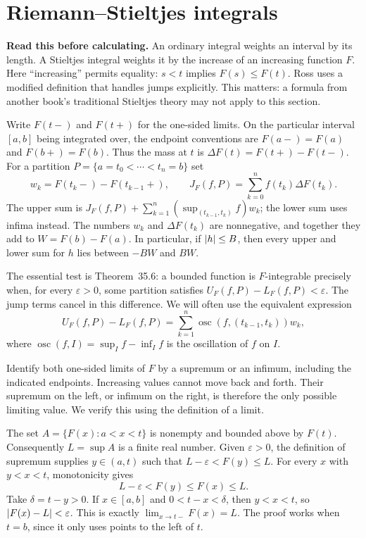 \section{Riemann--Stieltjes integrals}
\label{sec:rs-integrals}

\textbf{Read this before calculating.}
An ordinary integral weights an interval by its length. A Stieltjes
integral weights it by the increase of an increasing function $F$.
Here ``increasing'' permits equality: $s<t$ implies $F(s)\le F(t)$.
Ross uses a modified definition that handles jumps explicitly.
This matters: a formula from another book's traditional Stieltjes
theory may not apply to this section.

Write $F(t-)$ and $F(t+)$ for the one-sided limits. On the particular
interval $[a,b]$ being integrated over, the endpoint conventions are
$F(a-)=F(a)$ and $F(b+)=F(b)$. Thus the mass at $t$ is
$\Delta F(t)=F(t+)-F(t-)$. For a partition
$P=\{a=t_0<\cdots<t_n=b\}$ set
\[
 w_k=F(t_k-)-F(t_{k-1}+),\qquad
 J_F(f,P)=\sum_{k=0}^n f(t_k)\Delta F(t_k).
\]
The upper sum is $J_F(f,P)+\sum_{k=1}^n (\sup_{(t_{k-1},t_k)}f)w_k$;
the lower sum uses infima instead. The numbers $w_k$ and
$\Delta F(t_k)$ are nonnegative, and together they add to
$W=F(b)-F(a)$. In particular, if $\left|h\right|\le B$, then every upper
and lower sum for $h$ lies between $-BW$ and $BW$.

The essential test is Theorem~35.6: a bounded function is
$F$-integrable precisely when, for every $\varepsilon>0$, some
partition satisfies $U_F(f,P)-L_F(f,P)<\varepsilon$. The jump terms
cancel in this difference. We will often use the equivalent expression
\[
 U_F(f,P)-L_F(f,P)
 =\sum_{k=1}^n\operatorname{osc}(f,(t_{k-1},t_k))w_k,
\]
where $\operatorname{osc}(f,I)=\sup_I f-\inf_I f$ is the oscillation
of $f$ on $I$.

\goal Identify both one-sided limits of $F$ by a supremum or an
infimum, including the indicated endpoints.
\idea Increasing values cannot move back and forth. Their supremum
on the left, or infimum on the right, is therefore the only possible
limiting value. We verify this using the definition of a limit.

\step{(a) Approach $t\in(a,b]$ from the left.}
The set $A=\{F(x):a<x<t\}$ is nonempty and bounded above by $F(t)$.
Consequently $L=\sup A$ is a finite real number. Given
$\varepsilon>0$, the definition of supremum supplies $y\in(a,t)$
such that $L-\varepsilon<F(y)\le L$. For every $x$ with $y<x<t$,
monotonicity gives
\[
 L-\varepsilon<F(y)\le F(x)\le L.
\]
Take $\delta=t-y>0$. If $x\in[a,b]$ and
$0<t-x<\delta$, then $y<x<t$, so $\left|F(x)-L\right|<\varepsilon$.
This is exactly $\lim_{x\to t-}F(x)=L$. The proof works when
$t=b$, since it only uses points to the left of $t$.

